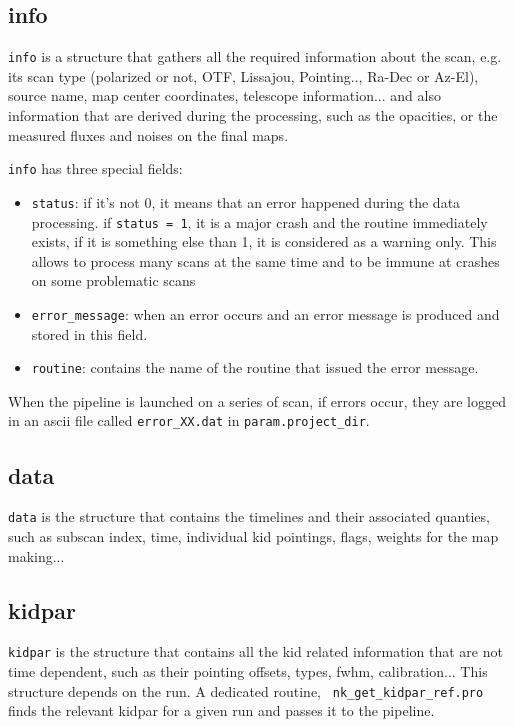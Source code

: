 \documentclass[a4paper,10pt]{article}
\begin{document}
\subsection{info}
{\tt info} is a structure that gathers all the required information about the
scan, e.g. its scan type (polarized or not, OTF, Lissajou, Pointing.., Ra-Dec or Az-El), source
name, map center coordinates, telescope information... and also information that
are derived during the processing, such as the opacities, or the measured fluxes
and noises on the final maps.

{\tt info} has three special fields:
\begin{itemize}
\item {\tt status}: if it's not 0, it means that an error happened during the
  data processing. if {\tt status = 1}, it is a major crash and the routine
  immediately exists, if it is something else than 1, it is considered as a
  warning only. This allows to process
  many scans at the same time and to be immune at crashes on some problematic
  scans
\item {\tt error\_message}: when an error occurs and an error message is
  produced and stored in this field.
\item {\tt routine}: contains the name of the routine that issued the error message.
\end{itemize}

When the pipeline is launched on a series of scan, if errors occur, they are
logged in an ascii file called {\tt error\_XX.dat} in {\tt param.project\_dir}.


\subsection{data}

{\tt data} is the structure that contains the timelines and their associated
quanties, such as subscan index, time, individual kid pointings, flags, weights for the map making...


\subsection{kidpar}
{\tt kidpar} is the structure that contains all the kid related information that
are not time dependent, such as their pointing offsets, types, fwhm,
calibration... This structure depends on the run. A dedicated routine, {\tt
  nk\_get\_kidpar\_ref.pro} finds the relevant kidpar for a given run and passes
it to the pipeline.\\
\end{document}
